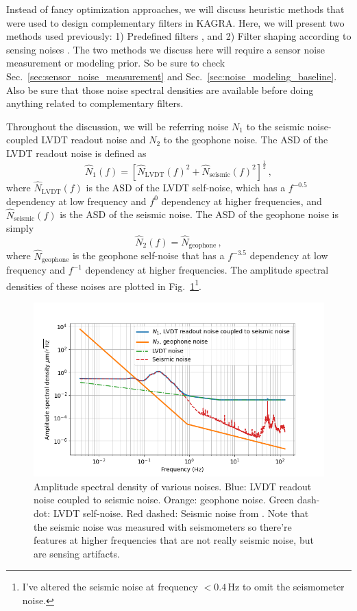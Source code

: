 Instead of fancy optimization approaches, we will discuss heuristic methods that were used to design complementary filters in KAGRA.
Here, we will present two methods used previously: 1) Predefined filters \cite{Sekiguchi:2016bmv, Heijningen:2018evm}, and 2) Filter shaping according to sensing noises \cite{low_frequency_optimization_and_performance_of_advanced_virgo_seismic_isolation_system}.
The two methods we discuss here will require a sensor noise measurement or modeling prior.
So be sure to check Sec.~\ref{sec:sensor_noise_measurement} and Sec.~\ref{sec:noise_modeling_baseline}.
Also be sure that those noise spectral densities are available before doing anything related to complementary filters.

Throughout the discussion, we will be referring noise $N_1$ to the seismic noise-coupled LVDT readout noise and $N_2$ to the geophone noise.
The ASD of the LVDT readout noise is defined as
\begin{equation}
	\hat{N}_1(f) = \left[ \hat{N}_\mathrm{LVDT}(f)^2 + \hat{N}_\mathrm{seismic}(f)^2 \right]^\frac{1}{2}\,,
\end{equation}
where $\hat{N}_\mathrm{LVDT}(f)$ is the ASD of the LVDT self-noise, which has a $f^{-0.5}$ dependency at low frequency and $f^{0}$ dependency at higher frequencies, and $\hat{N}_\mathrm{seismic}(f)$ is the ASD of the seismic noise.
The ASD of the geophone noise is simply
\begin{equation}
	\hat{N}_2(f) = \hat{N}_\mathrm{geophone}\,,
\end{equation}
where $\hat{N}_\mathrm{geophone}$ is the geophone self-noise that has a $f^{-3.5}$ dependency at low frequency and $f^{-1}$ dependency at higher frequencies.
The amplitude spectral densities of these noises are plotted in Fig.~\ref{fig:sensornoisesforcomplementaryfilter}\footnote{I've altered the seismic noise at frequency $<0.4\,\mathrm{Hz}$ to omit the seismometer noise.}.
\begin{figure}[!h]
	\centering
	\includegraphics[width=0.7\linewidth]{figures/sensor_noises_for_complementary_filter}
	\caption{Amplitude spectral density of various noises. Blue: LVDT readout noise coupled to seismic noise. Orange: geophone noise. Green dash-dot: LVDT self-noise. Red dashed: Seismic noise from \cite{seismic_noise_kagra}. Note that the seismic noise was measured with seismometers so there're features at higher frequencies that are not really seismic noise, but are sensing artifacts. }
	\label{fig:sensornoisesforcomplementaryfilter}
\end{figure}

